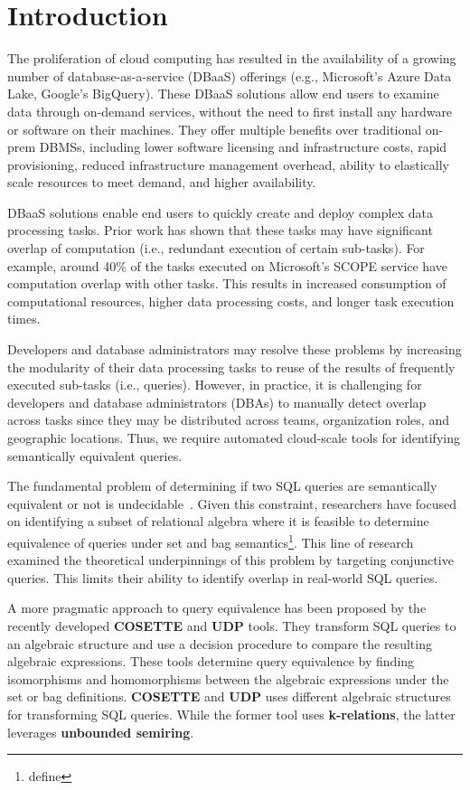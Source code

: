 \section{Introduction}\label{sec:introduction}

The proliferation of cloud computing has resulted in the availability of
a growing number of database-as-a-service (DBaaS) offerings (e.g., 
Microsoft's Azure Data Lake, Google's BigQuery). 
These DBaaS solutions allow end users to examine data through on-demand
services, without the need to first install any hardware or software on their
machines. They offer multiple benefits over traditional on-prem DBMSs,  
including lower software licensing and infrastructure costs, 
rapid provisioning, 
reduced infrastructure management overhead, 
ability to elastically scale resources to meet demand, and 
higher availability.

DBaaS solutions enable end users to quickly create and deploy complex data
processing tasks. Prior work has shown that these tasks may have significant
overlap of computation (i.e., redundant execution of certain sub-tasks).
For example, around 40\% of the tasks executed on Microsoft's SCOPE 
service have computation overlap with other tasks. This results in 
increased consumption of computational resources, higher data processing costs,
and longer task execution times. 

Developers and database administrators may resolve these problems by increasing
the modularity of their data processing tasks to reuse of the results of
frequently executed sub-tasks (i.e., queries). 
However, in practice, it is challenging for developers and database
administrators (DBAs) to manually detect overlap across tasks since they 
may be distributed across teams, organization roles,  and geographic locations.
Thus, we require automated cloud-scale tools for identifying 
semantically equivalent queries.

The fundamental problem of determining if two SQL queries are semantically
equivalent or not is undecidable~\cite{abiteboul95}.
Given this constraint, researchers have focused on identifying a subset of
relational algebra where it is feasible to determine equivalence of queries
under set and bag semantics\footnote{define}. This line of
research examined the theoretical underpinnings of this problem by targeting
conjunctive queries. This limits their ability to identify overlap in 
real-world SQL queries.

A more pragmatic approach to query equivalence has been proposed by the 
recently developed \textbf{COSETTE} and \textbf{UDP} tools.
They transform SQL queries to an algebraic structure and use a decision
procedure to compare the resulting algebraic expressions.
These tools determine query equivalence by finding isomorphisms and
homomorphisms between the algebraic expressions under the set or bag
definitions.
\textbf{COSETTE} and \textbf{UDP}  uses different algebraic structures
for transforming SQL queries. While the former tool uses \textbf{k-relations},
the latter leverages \textbf{unbounded semiring}.

